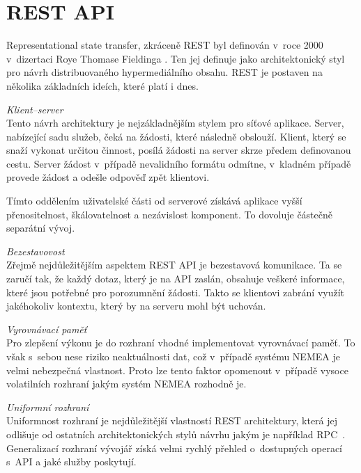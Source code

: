 \section{REST API}
\label{restapi}

Representational state transfer, zkráceně REST byl definován v~roce 2000 v~dizertaci Roye Thomase Fieldinga \cite{rest}. Ten jej definuje jako architektonický styl pro návrh distribuovaného hypermediálního obsahu. REST je postaven na několika základních ideích, které platí i dnes.

\begin{description}
    \item \textit{Klient--server} \\
        Tento návrh architektury je nejzákladnějším stylem pro síťové aplikace. Server, nabízející sadu služeb, čeká na žádosti, které následně obslouží. Klient, který se snaží vykonat určitou činnost, posílá žádosti na server skrze předem definovanou cestu. Server žádost v~případě nevalidního formátu odmítne, v~kladném případě provede žádost a odešle odpověď zpět klientovi.

        Tímto oddělením uživatelské části od serverové získává aplikace vyšší přenositelnost, škálovatelnost a nezávislost komponent. To dovoluje částečně separátní vývoj.
       
    \item \textit{Bezestavovost} \\
        Zřejmě nejdůležitějším aspektem REST API je bezestavová komunikace. Ta se zaručí tak, že každý dotaz, který je na API zaslán, obsahuje veškeré informace, které jsou potřebné pro porozumnění žádosti. Takto se klientovi zabrání využít jakéhokoliv kontextu, který by na serveru mohl být uchován.
       
    \item \textit{Vyrovnávací paměť} \\
        Pro zlepšení výkonu je do rozhraní vhodné implementovat vyrovnávací paměť. To však s~sebou nese riziko neaktuálnosti dat, což v~případě systému NEMEA je velmi nebezpečná vlastnost. Proto lze tento faktor opomenout v~případě vysoce volatilních rozhraní jakým systém NEMEA rozhodně je.
       
    \item \textit{Uniformní rozhraní} \\
        Uniformnost rozhraní je nejdůležitější vlastností REST architektury, která jej odlišuje od ostatních architektonických stylů návrhu jakým je například RPC~\cite{restful}. Generalizací rozhraní vývojář získá velmi rychlý přehled o~dostupných operací s~API a jaké služby poskytují.
        

\end{description}
